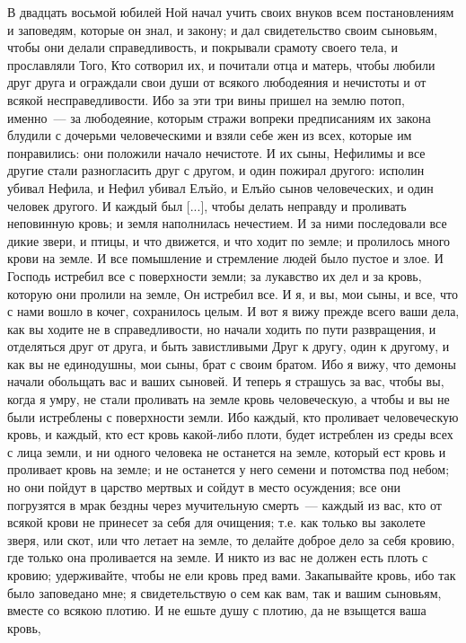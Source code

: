 В двадцать восьмой юбилей Ной начал учить своих
внуков всем постановлениям и заповедям, которые
он знал, и закону; и дал свидетельство своим
сыновьям, чтобы они делали справедливость, и
покрывали срамоту своего тела, и прославляли
Того, Кто сотворил их, и почитали отца и матерь,
чтобы любили друг друга и ограждали свои души от
всякого любодеяния и нечистоты и от всякой
несправедливости. Ибо за эти три вины пришел на
землю потоп, именно~--- за любодеяние, которым
стражи вопреки предписаниям их закона блудили с
дочерьми человеческими и взяли себе жен из всех,
которые им понравились: они положили начало
нечистоте. И их сыны, Нефилимы и все другие стали
разногласить друг с другом, и один пожирал
другого: исполин убивал Нефила, и Нефил убивал
Елъйо, и Елъйо сынов человеческих, и один человек
другого. И каждый был [...], чтобы делать неправду и
проливать неповинную кровь; и земля наполнилась
нечестием. И за ними последовали все дикие звери,
и птицы, и что движется, и что ходит по земле; и
пролилось много крови на земле. И все помышление
и стремление людей было пустое и злое. И Господь
истребил все с поверхности земли; за лукавство их
дел и за кровь, которую они пролили на земле, Он
истребил все. И я, и вы, мои сыны, и все, что с нами
вошло в кочег, сохранилось целым. И вот я вижу
прежде всего ваши дела, как вы ходите не в
справедливости, но начали ходить по пути
развращения, и отделяться друг от друга, и быть
завистливыми Друг к другу, один к другому, и как
вы не единодушны, мои сыны, брат с своим братом.
Ибо я вижу, что демоны начали обольщать вас и
ваших сыновей. И теперь я страшусь за вас, чтобы
вы, когда я умру, не стали проливать на земле
кровь человеческую, а чтобы и вы не были
истреблены с поверхности земли. Ибо каждый, кто
проливает человеческую кровь, и каждый, кто ест
кровь какой-либо плоти, будет истреблен из среды
всех с лица земли, и ни одного человека не
останется на земле, который ест кровь и проливает
кровь на земле; и не останется у него семени и
потомства под небом; но они пойдут в царство
мертвых и сойдут в место осуждения; все они
погрузятся в мрак бездны через мучительную
смерть~--- каждый из вас, кто от всякой крови не
принесет за себя для очищения; т.е. как только вы
заколете зверя, или скот, или что летает на земле,
то делайте доброе дело за себя кровию, где только
она проливается на земле. И никто из вас не должен
есть плоть с кровию; удерживайте, чтобы не ели
кровь пред вами. Закапывайте кровь, ибо так было
заповедано мне; я свидетельствую о сем как вам,
так и вашим сыновьям, вместе со всякою плотию. И
не ешьте душу с плотию, да не взыщется ваша кровь,
